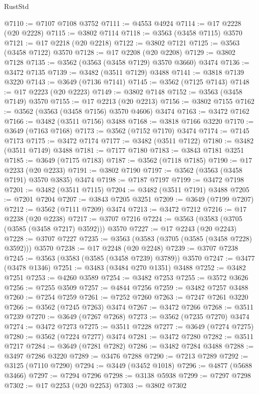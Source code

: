 \begin{lexlean}{RustStd}
\begin{coremodule}
{\begin{coremodule}
{{{{{{{{{{{{{{{{{{{{{{{{{{{{{{{{{{{{{{{{{{{{{@7110 := @7107 @7108 @3752
@7111 := @4553 @4924
@7114 := @17 @2228 (@20 @2228)
@7115 := @3802 @7114
@7118 := @3563 (@3458 @7115) @3570
@7121 := @17 @2218 (@20 @2218)
@7122 := @3802 @7121
@7125 := @3563 (@3458 @7122) @3570
@7128 := @17 @2208 (@20 @2208)
@7129 := @3802 @7128
@7135 := @3562 (@3563 (@3458 @7129) @3570 @3660) @3474
@7136 := @3472 @7135
@7139 := @3482 (@3511 @7129) @3488
@7141 := @3818 @7139 @3220
@7143 := @3649 (@7136 @7141)
@7145 := @3562 (@7125 @7143)
@7148 := @17 @2223 (@20 @2223)
@7149 := @3802 @7148
@7152 := @3563 (@3458 @7149) @3570
@7155 := @17 @2213 (@20 @2213)
@7156 := @3802 @7155
@7162 := @3562 (@3563 (@3458 @7156) @3570 @4606) @3474
@7163 := @3472 @7162
@7166 := @3482 (@3511 @7156) @3488
@7168 := @3818 @7166 @3220
@7170 := @3649 (@7163 @7168)
@7173 := @3562 (@7152 @7170) @3474
@7174 := @7145 @7173
@7175 := @3472 @7174
@7177 := @3482 (@3511 @7122)
@7180 := @3482 (@3511 @7149) @3488
@7181 := @7177 @7180
@7183 := @3843 @7181 @3251
@7185 := @3649 (@7175 @7183)
@7187 := @3562 (@7118 @7185)
@7190 := @17 @2233 (@20 @2233)
@7191 := @3802 @7190
@7197 := @3562 (@3563 (@3458 @7191) @3570 @3835) @3474
@7198 := @7187 @7197
@7199 := @3472 @7198
@7201 := @3482 (@3511 @7115)
@7204 := @3482 (@3511 @7191) @3488
@7205 := @7201 @7204
@7207 := @3843 @7205 @3251
@7209 := @3649 (@7199 @7207)
@7212 := @3562 (@7111 @7209) @3474
@7213 := @3472 @7212
@7216 := @17 @2238 (@20 @2238)
@7217 := @3707 @7216
@7224 := @3563 (@3583 (@3705 (@3585 (@3458 @7217) @3592))) @3570
@7227 := @17 @2243 (@20 @2243)
@7228 := @3707 @7227
@7235 := @3563 (@3583 (@3705 (@3585 (@3458 @7228) @3592))) @3570
@7238 := @17 @2248 (@20 @2248)
@7239 := @3707 @7238
@7245 := @3563 (@3583 (@3585 (@3458 @7239) @3789)) @3570
@7247 := @3477 (@3478 @1346)
@7251 := @3483 (@3484 @270 @1351) @3488
@7252 := @3482 @7251
@7253 := @4260 @3589
@7254 := @3482 @7253
@7255 := @3572 @3626
@7256 := @7255 @3509
@7257 := @4844 @7256
@7259 := @3482 @7257 @3488
@7260 := @7254 @7259
@7261 := @7252 @7260
@7263 := @7247 @7261 @3220
@7266 := @3562 (@7245 @7263) @3474
@7267 := @3472 @7266
@7268 := @3511 @7239
@7270 := @3649 (@7267 @7268)
@7273 := @3562 (@7235 @7270) @3474
@7274 := @3472 @7273
@7275 := @3511 @7228
@7277 := @3649 (@7274 @7275)
@7280 := @3562 (@7224 @7277) @3474
@7281 := @3472 @7280
@7282 := @3511 @7217
@7284 := @3649 (@7281 @7282)
@7286 := @3482 @7284 @3488
@7288 := @3497 @7286 @3220
@7289 := @3476 @7288
@7290 := @7213 @7289
@7292 := @3125 (@7110 @7290)
@7294 := @3449 (@3452 @1018)
@7296 := @4877 (@5688 @3466)
@7297 := @7294 @7296
@7298 := @3138 @5938
@7299 := @7297 @7298
@7302 := @17 @2253 (@20 @2253)
@7303 := @3802 @7302
}}}}}}}}}}}}}}}}}}}}}}}}}}}}}}}}}}}}}}}}}}}}}
\end{coremodule}}
\end{coremodule}
\end{lexlean}
